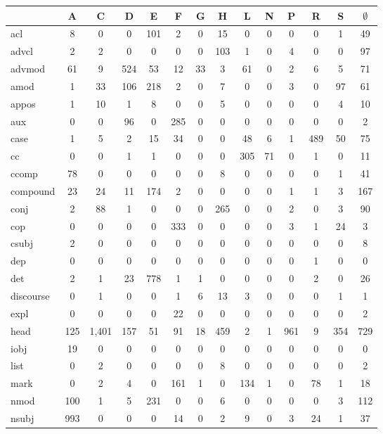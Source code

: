 \documentclass[11pt,a4paper]{article}
\begin{document}
\begin{table}[t]
\centering
\scriptsize
\setlength\tabcolsep{2pt}
\begin{tabular}{l|ccccccccccccc}
 & A & C & D & E & F & G & H & L & N & P & R & S & $\emptyset$ \\
\hline
acl & 8 & 0 & 0 & 101 & 2 & 0 & 15 & 0 & 0 & 0 & 0 & 1 & 49 \\
advcl & 2 & 2 & 0 & 0 & 0 & 0 & 103 & 1 & 0 & 4 & 0 & 0 & 97 \\
advmod & 61 & 9 & 524 & 53 & 12 & 33 & 3 & 61 & 0 & 2 & 6 & 5 & 71 \\
amod & 1 & 33 & 106 & 218 & 2 & 0 & 7 & 0 & 0 & 3 & 0 & 97 & 61 \\
appos & 1 & 10 & 1 & 8 & 0 & 0 & 5 & 0 & 0 & 0 & 0 & 4 & 10 \\
aux & 0 & 0 & 96 & 0 & 285 & 0 & 0 & 0 & 0 & 0 & 0 & 0 & 2 \\
case & 1 & 5 & 2 & 15 & 34 & 0 & 0 & 48 & 6 & 1 & 489 & 50 & 75 \\
cc & 0 & 0 & 1 & 1 & 0 & 0 & 0 & 305 & 71 & 0 & 1 & 0 & 11 \\
ccomp & 78 & 0 & 0 & 0 & 0 & 0 & 8 & 0 & 0 & 0 & 0 & 1 & 41 \\
compound & 23 & 24 & 11 & 174 & 2 & 0 & 0 & 0 & 0 & 1 & 1 & 3 & 167 \\
conj & 2 & 88 & 1 & 0 & 0 & 0 & 265 & 0 & 0 & 2 & 0 & 3 & 90 \\
cop & 0 & 0 & 0 & 0 & 333 & 0 & 0 & 0 & 0 & 3 & 1 & 24 & 3 \\
csubj & 2 & 0 & 0 & 0 & 0 & 0 & 0 & 0 & 0 & 0 & 0 & 0 & 8 \\
dep & 0 & 0 & 0 & 0 & 0 & 0 & 0 & 0 & 0 & 0 & 1 & 0 & 0 \\
det & 2 & 1 & 23 & 778 & 1 & 1 & 0 & 0 & 0 & 0 & 2 & 0 & 26 \\
discourse & 0 & 1 & 0 & 0 & 1 & 6 & 13 & 3 & 0 & 0 & 0 & 1 & 1 \\
expl & 0 & 0 & 0 & 0 & 22 & 0 & 0 & 0 & 0 & 0 & 0 & 0 & 2 \\
head & 125 & 1,401 & 157 & 51 & 91 & 18 & 459 & 2 & 1 & 961 & 9 & 354 & 729 \\
iobj & 19 & 0 & 0 & 0 & 0 & 0 & 0 & 0 & 0 & 0 & 0 & 0 & 0 \\
list & 0 & 2 & 0 & 0 & 0 & 0 & 8 & 0 & 0 & 0 & 0 & 0 & 2 \\
mark & 0 & 2 & 4 & 0 & 161 & 1 & 0 & 134 & 1 & 0 & 78 & 1 & 18 \\
nmod & 100 & 1 & 5 & 231 & 0 & 0 & 6 & 0 & 0 & 0 & 0 & 3 & 112 \\
nsubj & 993 & 0 & 0 & 0 & 14 & 0 & 2 & 9 & 0 & 3 & 24 & 1 & 37 \\

\end{tabular}
\end{table}
\end{document}
